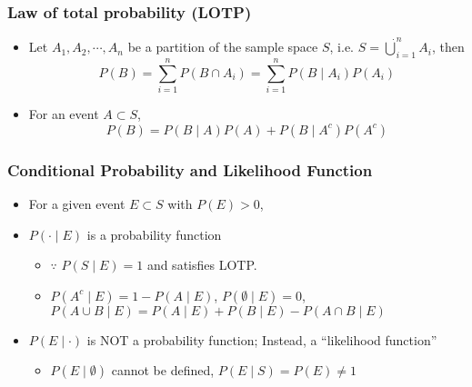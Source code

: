 \subsubsection*{Law of total probability (LOTP)}
\begin{itemize}
    \item Let $A_1,A_2,\cdots,A_n$ be a partition of the sample space $S$, i.e. $S=\dot{\bigcup}_{i=1}^nA_i$, then
    \begin{equation}
        P(B)=\sum_{i=1}^nP(B\cap A_i)=\sum_{i=1}^nP(B\mid A_i)P(A_i)
    \end{equation}
    \item For an event $A\subset S$,
    \begin{equation}
        P(B)=P(B\mid A)P(A)+P(B\mid A^c)P(A^c)
    \end{equation}
\end{itemize}

\subsubsection*{Conditional Probability and Likelihood Function}
\begin{itemize}
    \item For a given event $E\subset S$ with $P(E)>0$,
    \item $P(\cdot\mid E)$ is a probability function
    \begin{itemize}
        \item $\because$ $P(S\mid E)=1$ and satisfies LOTP.
        \item $P(A^c\mid E)=1-P(A\mid E)$, $P(\emptyset\mid E)=0$, $P(A\cup B\mid E)=P(A\mid E)+P(B\mid E)-P(A\cap B\mid E)$
    \end{itemize}
    \item $P(E\mid\cdot)$ is NOT a probability function; Instead, a ``likelihood function''
    \begin{itemize}
        \item $P(E\mid\emptyset)$ cannot be defined, $P(E\mid S)=P(E)\neq 1$
    \end{itemize}
\end{itemize}


